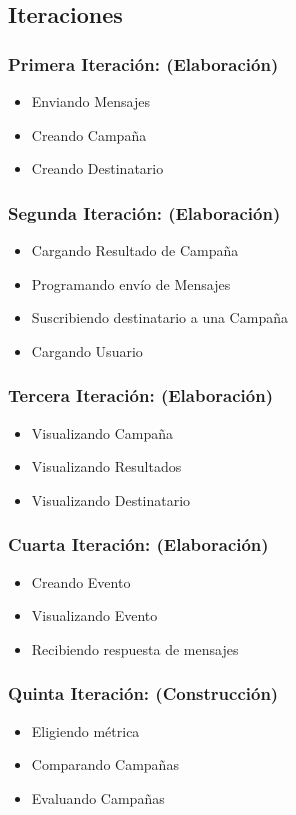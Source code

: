 \documentclass[a4paper, 11pt]{article}
\begin{document}
\subsection{Iteraciones}
\subsubsection{Primera Iteraci\'on: (Elaboraci\'on)}
\begin{itemize}
\item Enviando Mensajes
\item Creando Campaña
\item Creando Destinatario
\end{itemize}

\subsubsection{Segunda Iteraci\'on: (Elaboraci\'on)}
\begin{itemize}
\item Cargando Resultado de Campaña
\item Programando envío de Mensajes
\item Suscribiendo destinatario a una Campaña
\item Cargando Usuario
\end{itemize}


\subsubsection{Tercera Iteraci\'on: (Elaboraci\'on)}
\begin{itemize}
\item Visualizando Campaña
\item Visualizando Resultados
\item Visualizando Destinatario
\end{itemize}


\subsubsection{Cuarta Iteraci\'on: (Elaboraci\'on)}
\begin{itemize}
\item Creando Evento
\item Visualizando Evento
\item Recibiendo respuesta de mensajes
\end{itemize}


\subsubsection{Quinta Iteraci\'on: (Construcci\'on)}
\begin{itemize}
\item Eligiendo métrica
\item Comparando Campañas
\item Evaluando Campañas
\end{itemize}
\end{document}
